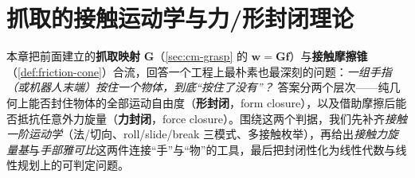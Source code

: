 \chapter{抓取的接触运动学与力/形封闭理论}
\label{ch:grasp-closure}


\providecommand{\rank}{\operatorname{rank}}
\providecommand{\range}{\operatorname{range}}
\providecommand{\rowsp}{\operatorname{row}}
\providecommand{\spanop}{\operatorname{span}}
\providecommand{\pos}{\operatorname{pos}}
\providecommand{\conv}{\operatorname{conv}}
\providecommand{\intop}{\operatorname{int}}
\providecommand{\skewm}[1]{\widehat{#1}}

本章把前面建立的\textbf{抓取映射} $\mathbf{G}$（\cref{sec:cm-grasp} 的 $\mathbf{w}=\mathbf{G}\mathbf{f}$）与\textbf{接触摩擦锥}（\cref{def:friction-cone}）合流，回答一个工程上最朴素也最深刻的问题：\emph{一组手指（或机器人末端）按住一个物体，到底“按住了没有”？} 答案分两个层次——纯几何上能否封住物体的全部运动自由度（\textbf{形封闭}，form closure），以及借助摩擦后能否抵抗任意外力旋量（\textbf{力封闭}，force closure）。围绕这两个判据，我们先补齐\emph{接触一阶运动学}（法/切向、roll/slide/break 三模式、多接触枚举），再给出\emph{接触力旋量基}与\emph{手部雅可比}这两件连接“手”与“物”的工具，最后把封闭性化为线性代数与线性规划上的可判定问题。

